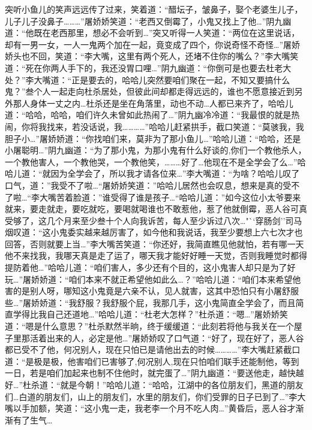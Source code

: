 \documentclass[12pt,oneside]{book}
\begin{document}
突听小鱼儿的笑声远远传了过来，笑着道：``醋坛子，皱鼻子，娶个老婆生儿子，儿子儿子没鼻子\ldots\ldots\ldots{}''屠娇娇笑道：``老西又倒霉了，小鬼又找上了他\ldots{}''阴九幽道：``他既在老西那里，想必不会听到\ldots{}''突又听得一人笑道：``两位在这里说话，却有一男一女，一人一鬼两个加在一起，竟变成了四个，你说奇怪不奇怪\ldots{}''屠娇娇头也不回，笑道：``李大嘴，这里有两个死人，还堵不住你的嘴么？''李大嘴笑道：``死在你两人手下的，我还没胃口哩\ldots{}''阴九幽道：``你倒可是也要去杜老大处？''李大嘴道：``正是要去的，哈哈儿突然要咱们聚在一起，不知又要搞什么鬼？''叁个人一起走向杜杀居处，但彼此间却都走得远远的，谁也不愿意接近到另外那人身体一丈之内\ldots 杜杀还是坐在角落里，动也不动\ldots 人都已来齐了，哈哈儿道：``哈哈，哈哈，咱们许久未曾如此热闹了\ldots{}''阴九幽冷冷道：``我最恨的就是热闹，你将我找来，若没话说，我\ldots\ldots\ldots\ldots{}''哈哈儿赶紧拱手，截口笑道：``莫骇我，我胆子小\ldots{}''屠娇娇道：``你找咱们来，莫非为了那小鱼儿\ldots{}''哈哈儿道：``哈哈，还是小屠聪明\ldots{}''阴九幽道：``为了那小鬼，为那小鬼有什么好谈的,你们一个教他杀人，一个教他害人，一个教他哭，一个教他笑，\ldots\ldots\ldots 好了\ldots 他现在不是全学会了么\ldots{}''哈哈儿道：``就因为全学会了，所以我才请各位来\ldots{}''李大嘴道：``为啥？哈哈儿叹了口气，道：''我受不了啦\ldots{}``屠娇娇笑道：''哈哈儿居然也会叹息，想来是真的受不了啦\ldots{}``李大嘴苦着脸道：''谁受得了谁是孩子\ldots{}``哈哈儿道：''如今这位小太爷要来就来，要走就走，要吃就吃，要喝就喝谁也不敢惹他，惹了他就倒霉，恶人谷可真受够了，这几个月来至少叁十个人向我诉苦，每人至少诉过八次\ldots"``穿肠剑''司马烟叹道：``这小鬼委实越来越厉害了，如今他和我说话，我至少要想上六七次才也回答，否则就要上当\ldots{}''李大嘴苦笑道：``你还好，我简直瞧见他就怕，若有哪一天他不来找我，我哪天真是走了运了，哪天我才能好好睡一天觉，否则我睡觉时都得提防着他\ldots{}''哈哈儿道：``咱们害人，多少还有个目的，这小鬼害人却只是为了好玩\ldots{}''屠娇娇道：``咱们本来不就正希望他如此么\ldots？''哈哈儿道：``咱们本来希望他害的是别人呀，哪知这小鬼竟是六亲不认，见人就害，这其中恐怕只有小屠舒服些\ldots{}''屠娇娇道：``我舒服？我舒服个屁，我那几手，这小鬼简直全学会了，而且简直学得比我自己还道地\ldots{}''哈哈儿道：``杜老大怎样？''杜杀道：``嗯\ldots{}''屠娇娇笑道：``嗯是什么意思？''杜杀默然半晌，终于缓缓道：``此刻若将他与我关在一个屋子里那活着出来的人，必定是他\ldots{}''屠娇娇叹了口气道：``好了，现在好了，恶人谷都已受不了他，何况别人，现在只怕已是请他出去的时候\ldots\ldots\ldots\ldots{}''李大嘴赶紧截口道：``是极是极，他害咱们已害够了,何况别人,现在只怕咱们联手还能制他，等到一日，若是咱们加起来也制不住他时，就完蛋了\ldots{}''阴九幽道：``要送他走，越快越好\ldots{}''杜杀道：``就是今朝！''哈哈儿道：``哈哈，江湖中的各位朋友们，黑道的朋友们\ldots 白道的朋友们，山上的朋友们，水里的朋友们，你们受罪的日子已到了\ldots{}''李大嘴以手加额，笑道：``这小鬼一走，我老李一个月不吃人肉\ldots{}''黄昏后，恶人谷才渐渐有了生气\ldots 
\end{document}
